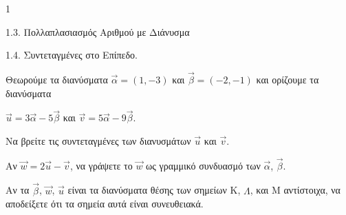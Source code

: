 \begin{ylh}{1}
    \item 1.3. Πολλαπλασιασμός Αριθμού με Διάνυσμα
    \item 1.4. Συντεταγμένες στο Επίπεδο.
\end{ylh}
Θεωρούμε τα διανύσματα $\vec{\alpha} = (1,-3)$ και $\vec{\beta} = (-2,-1)$ και ορίζουμε τα διανύσματα
\par\qquad $\vec{u} = 3\vec{\alpha} - 5\vec{\beta}$ και $\vec{v} = 5\vec{\alpha} - 9\vec{\beta}$.
\begin{alist}
\item Να βρείτε τις συντεταγμένες των διανυσμάτων $\vec{u}$ και $\vec{v}$. 
\item Αν $\vec{w} = 2\vec{u} - \vec{v}$, να γράψετε το $\vec{w}$ ως γραμμικό συνδυασμό των $\vec{\alpha}$, $\vec{\beta}$. 
\item Αν τα $\vec{\beta}$, $\vec{w}$, $\vec{u}$ είναι τα διανύσματα θέσης των σημείων K, $\Lambda$, και M αντίστοιχα, να αποδείξετε ότι τα σημεία αυτά είναι συνευθειακά. 
\end{alist}